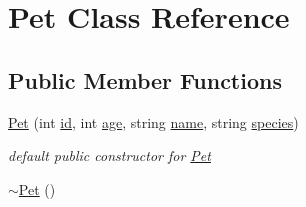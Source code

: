 \hypertarget{classPet}{}\section{Pet Class Reference}
\label{classPet}
\subsection*{Public Member Functions}
\begin{DoxyCompactItemize}
\item 
\hyperlink{classPet_a2c1700a67737b834c854f1af2f848b08}{Pet} (int \hyperlink{classPet_a5a74e6d92560146480325e5360267d22}{id}, int \hyperlink{classPet_a92cf22dcb533eb24a000e794b5943db4}{age}, string \hyperlink{classPet_a7b9dbda4662eac425d0f65a4abe92f0f}{name}, string \hyperlink{classPet_a88b2513dc42cce72da3e649e7c333ef9}{species})\hypertarget{classPet_a2c1700a67737b834c854f1af2f848b08}{}\label{classPet_a2c1700a67737b834c854f1af2f848b08}

\begin{DoxyCompactList}\small\item\em default public constructor for \hyperlink{classPet}{Pet} \end{DoxyCompactList}\item 
\hyperlink{classPet_aa4ec4b6b3b4dccd3cbed246f77aab372}{$\sim$\+Pet} ()\hypertarget{classPet_aa4ec4b6b3b4dccd3cbed246f77aab372}{}\label{classPet_aa4ec4b6b3b4dccd3cbed246f77aab372}


\end{DoxyCompactItemize}
